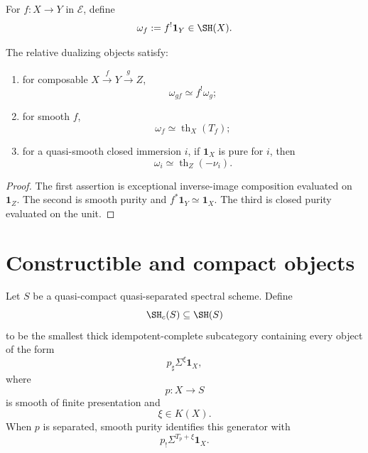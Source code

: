 \begin{definition}
\label{def:relative-dualizing-object}
For \(f:X\to Y\) in \(\mathcal E\), define
\[
    \omega_f
    :=
    f^!\mathbf1_Y
    \in
    \SH(X).
\]
\end{definition}

\begin{proposition}
\label{prop:dualizing-object-calculus}
The relative dualizing objects satisfy:
\begin{enumerate}
    \item for composable \(X\xrightarrow{f}Y\xrightarrow{g}Z\),
    \[
        \omega_{gf}
        \simeq
        f^!\omega_g;
    \]

    \item for smooth \(f\),
    \[
        \omega_f
        \simeq
        \operatorname{th}_X(T_f);
    \]

    \item for a quasi-smooth closed immersion \(i\), if \(\mathbf1_X\) is
    pure for \(i\), then
    \[
        \omega_i
        \simeq
        \operatorname{th}_Z(-\nu_i).
    \]
\end{enumerate}
\end{proposition}

\begin{proof}
The first assertion is exceptional inverse-image composition evaluated on
\(\mathbf1_Z\).  The second is smooth purity and
\(f^*\mathbf1_Y\simeq\mathbf1_X\).  The third is closed purity evaluated
on the unit.
\end{proof}

\section{Constructible and compact objects}
\label{sec:six-constructible}

\begin{definition}
\label{def:six-constructible-objects}
Let \(S\) be a quasi-compact quasi-separated spectral scheme.  Define
\[
    \SH_c(S)
    \subseteq
    \SH(S)
\]
to be the smallest thick idempotent-complete subcategory containing every
object of the form
\[
    p_\sharp\Sigma^\xi\mathbf1_X,
\]
where
\[
    p:X\longrightarrow S
\]
is smooth of finite presentation and
\[
    \xi\in K(X).
\]
When \(p\) is separated, smooth purity identifies this generator with
\[
    p_!\Sigma^{T_p+\xi}\mathbf1_X.
\]
\end{definition}

